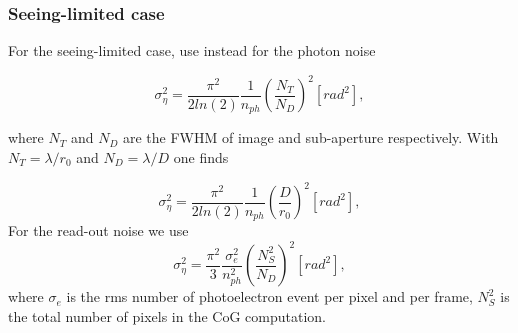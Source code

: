 \documentclass[a4paper,12pt]{article}
\newcommand{\0}{\mathsf{0}} %
\begin{document}
\subsubsection{Seeing-limited case}
For the seeing-limited case, use instead for the photon noise

\begin{equation}
  \sigma^2_\eta = \frac{\pi^2}{2 ln(2)}\frac {1}{n_{ph}} \left(
    \frac{N_T}{N_D}\right)^2 [rad^2] ,
\end{equation}

where $N_T$ and $N_D$ are the FWHM of image and sub-aperture
respectively. With $N_T = \lambda/r_0$ and $N_D = \lambda/D$ one finds

\begin{equation}
  \sigma^2_\eta = \frac{\pi^2}{2 ln(2)}\frac {1}{n_{ph}} \left(
    \frac{D}{r_0}\right)^2 [rad^2] ,
\end{equation}
For the read-out noise we use
\begin{equation}
  \sigma^2_\eta = \frac{\pi^2}{3}\frac {\sigma_e^2}{n^2_{ph}} \left(
    \frac{N_S^2}{N_D}\right)^2 [rad^2] ,
\end{equation}
where $\sigma_e$ is the rms number of photoelectron event per pixel
and per frame, $N_S^2$ is the total number of pixels in the CoG computation. 



\end{document}
